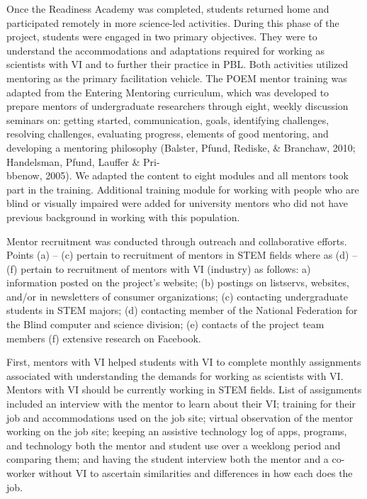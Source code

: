 \documentclass[11pt]{sig-alternate}
\begin{document}
\begin{large}
Once the Readiness Academy was completed, students returned home and participated remotely in more science-led activities. During this phase of the project, students were engaged in two primary objectives. They were to understand the accommodations and adaptations required for working as scientists with VI and to further their practice in PBL. Both activities utilized mentoring as the primary facilitation vehicle. The POEM mentor training was adapted from the Entering Mentoring curriculum, which was developed to prepare mentors of undergraduate researchers through eight, weekly discussion seminars on: getting started, communication, goals, identifying challenges, resolving challenges, evaluating progress, elements of good mentoring, and developing a mentoring philosophy (Balster, Pfund, Rediske, \& Branchaw, 2010; Handelsman, Pfund, Lauffer \& Pri-\\bbenow, 2005). We adapted the content to eight modules and all mentors took part in the training. Additional training module for working with people who are blind or visually impaired were added for university mentors who did not have previous background in working with this population.

Mentor recruitment was conducted through outreach and collaborative efforts. Points (a) – (c) pertain to recruitment of mentors in STEM fields where as (d) – (f) pertain to recruitment of mentors with VI (industry) as follows: a) information posted on the project's website; (b) postings on listservs, websites, and/or in newsletters of consumer organizations; (c) contacting undergraduate students in STEM majors; (d) contacting member of the National Federation for the Blind computer and science division; (e) contacts of the project team members (f) extensive research on Facebook.

First, mentors with VI helped students with VI to complete monthly assignments associated with understanding the demands for working as scientists with VI. Mentors with VI should be currently working in STEM fields. List of assignments included an interview with the mentor to learn about their VI; training for their job and accommodations used on the job site; virtual observation of the mentor working on the job site; keeping an assistive technology log of apps, programs, and technology both the mentor and student use over a weeklong period and comparing them; and having the student interview both the mentor and a co-worker without VI to ascertain similarities and differences in how each does the job.


\end{large}
\end{document}
